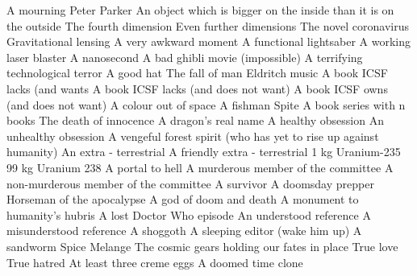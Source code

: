 \begin{multicols}{2}
\begin{small}
\begin{tabbing}
           {A mourning Peter Parker\E}
           {An object which is bigger on the inside than it is on the outside }
           {The fourth dimension}
           {Even further dimensions \E}
          {The novel coronavirus}
           {Gravitational lensing}
           {A very awkward moment \FD}
           {A functional lightsaber}
          {A working laser blaster}
           {A nanosecond}
          {A bad ghibli movie (impossible)\FD}
          {A terrifying technological terror}
           {A good hat\FD}
           {The fall of man}
           {Eldritch music}
          {A book ICSF lacks (and wants}
          {A book ICSF lacks (and does not want)}
           {A book ICSF owns (and does not want)}
          {A colour out of space}
          {A fishman}
          {Spite}
       {A book series with n books\M}
          {The death of innocence}
          {A dragon's real name}
          {A healthy obsession}
          {An unhealthy obsession}
          {A vengeful forest spirit (who has yet to rise up against humanity)}
          {An extra - terrestrial}
          {A friendly extra - terrestrial}
          {1 kg Uranium-235 \E}
           {99 kg Uranium 238 \E}
         {A portal to hell \E}
         {A murderous member of the committee}
         {A non-murderous member of the committee}
          {A survivor\E}
          {A doomsday prepper\E}
           {Horseman of the apocalypse \E}
           {A god of doom and death}
          {A monument to humanity's hubris}
          {A lost Doctor Who episode}
           {An understood reference\E}
          {A misunderstood reference\E}
          {A shoggoth \E}
           {A sleeping editor (wake him up)}
           {A sandworm}
           {Spice Melange}
           {The cosmic gears holding our fates in place}
          {True love}
           {True hatred}
          {At least three creme eggs }
        {A doomed time clone}

\end{tabbing}
\end{small}
\end{multicols}
